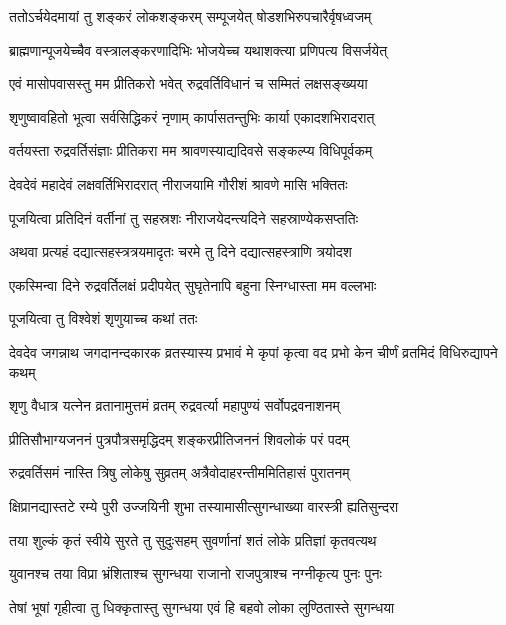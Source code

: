 \twolineshloka
{ततोऽर्चयेदमायां तु शङ्करं लोकशङ्करम्}
{सम्पूजयेत् षोडशभिरुपचारैर्वृषध्वजम्} %

\twolineshloka
{ब्राह्मणान्पूजयेच्चैव वस्त्रालङ्करणादिभिः}
{भोजयेच्च यथाशक्त्या प्रणिपत्य विसर्जयेत्} %

\twolineshloka
{एवं मासोपवासस्तु मम प्रीतिकरो भवेत्}
{रुद्रवर्तिविधानं च सम्मितं लक्षसङ्ख्यया} %

\twolineshloka
{शृणुष्वावहितो भूत्वा सर्वसिद्धिकरं नृणाम्}
{कार्पासतन्तुभिः कार्या एकादशभिरादरात्} %

\twolineshloka
{वर्तयस्ता रुद्रवर्तिसंज्ञाः प्रीतिकरा मम}
{श्रावणस्याद्यदिवसे सङ्कल्प्य विधिपूर्वकम्} %

\twolineshloka
{देवदेवं महादेवं लक्षवर्तिभिरादरात्}
{नीराजयामि गौरीशं श्रावणे मासि भक्तितः} %

\twolineshloka
{पूजयित्वा प्रतिदिनं वर्तीनां तु सहस्रशः}
{नीराजयेदन्त्यदिने सहस्राण्येकसप्ततिः} %

\twolineshloka
{अथवा प्रत्यहं दद्यात्सहस्त्रत्रयमादृतः}
{चरमे तु दिने दद्यात्सहस्त्राणि त्रयोदश} %

\twolineshloka
{एकस्मिन्वा दिने रुद्रवर्तिलक्षं प्रदीपयेत्}
{सुघृतेनापि बहुना स्निग्धास्ता मम वल्लभाः} %

\onelineshloka
{पूजयित्वा तु विश्वेशं शृणुयाच्च कथां ततः} %



\threelineshloka
{देवदेव जगन्नाथ जगदानन्दकारक}
{व्रतस्यास्य प्रभावं मे कृपां कृत्वा वद प्रभो}
{केन चीर्णं व्रतमिदं विधिरुद्यापने कथम्} %


\twolineshloka
{शृणु वैधात्र यत्नेन व्रतानामुत्तमं व्रतम्}
{रुद्रवर्त्या महापुण्यं सर्वोपद्रवनाशनम्} %

\twolineshloka
{प्रीतिसौभाग्यजननं पुत्रपौत्रसमृद्धिदम्}
{शङ्करप्रीतिजननं शिवलोकं परं पदम्} %

\twolineshloka
{रुद्रवर्तिसमं नास्ति त्रिषु लोकेषु सुव्रतम्}
{अत्रैवोदाहरन्तीममितिहासं पुरातनम्} %

\twolineshloka
{क्षिप्रानद्यास्तटे रम्ये पुरी उज्जयिनी शुभा}
{तस्यामासीत्सुगन्धाख्या वारस्त्री ह्यतिसुन्दरा} %

\twolineshloka
{तया शुल्कं कृतं स्वीये सुरते तु सुदुःसहम्}
{सुवर्णानां शतं लोके प्रतिज्ञां कृतवत्यथ} %

\twolineshloka
{युवानश्च तया विप्रा भ्रंशिताश्च सुगन्धया}
{राजानो राजपुत्राश्च नग्नीकृत्य पुनः पुनः} %

\twolineshloka
{तेषां भूषां गृहीत्वा तु धिक्कृतास्तु सुगन्धया}
{एवं हि बहवो लोका लुण्ठितास्ते सुगन्धया} %

